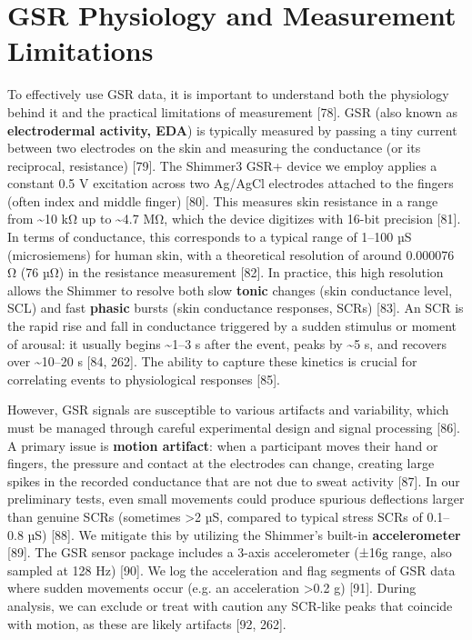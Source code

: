 \documentclass{article}
\begin{document}
    \section{GSR Physiology and Measurement Limitations}
    To effectively use GSR data, it is important to understand both the physiology behind it and the practical limitations of measurement [78]. GSR (also known as \textbf{electrodermal activity, EDA}) is typically measured by passing a tiny current between two electrodes on the skin and measuring the conductance (or its reciprocal, resistance) [79]. The Shimmer3 GSR+ device we employ applies a constant 0.5 V excitation across two Ag/AgCl electrodes attached to the fingers (often index and middle finger) [80]. This measures skin resistance in a range from \textasciitilde10 kΩ up to \textasciitilde4.7 MΩ, which the device digitizes with 16-bit precision [81]. In terms of conductance, this corresponds to a typical range of 1–100 µS (microsiemens) for human skin, with a theoretical resolution of around 0.000076 Ω (76 µΩ) in the resistance measurement [82]. In practice, this high resolution allows the Shimmer to resolve both slow \textbf{tonic} changes (skin conductance level, SCL) and fast \textbf{phasic} bursts (skin conductance responses, SCRs) [83]. An SCR is the rapid rise and fall in conductance triggered by a sudden stimulus or moment of arousal: it usually begins \textasciitilde1–3 s after the event, peaks by \textasciitilde5 s, and recovers over \textasciitilde10–20 s [84, 262]. The ability to capture these kinetics is crucial for correlating events to physiological responses [85].

    However, GSR signals are susceptible to various artifacts and variability, which must be managed through careful experimental design and signal processing [86]. A primary issue is \textbf{motion artifact}: when a participant moves their hand or fingers, the pressure and contact at the electrodes can change, creating large spikes in the recorded conductance that are not due to sweat activity [87]. In our preliminary tests, even small movements could produce spurious deflections larger than genuine SCRs (sometimes >2 µS, compared to typical stress SCRs of 0.1–0.8 µS) [88]. We mitigate this by utilizing the Shimmer’s built-in \textbf{accelerometer} [89]. The GSR sensor package includes a 3-axis accelerometer (±16g range, also sampled at 128 Hz) [90]. We log the acceleration and flag segments of GSR data where sudden movements occur (e.g. an acceleration >0.2 g) [91]. During analysis, we can exclude or treat with caution any SCR-like peaks that coincide with motion, as these are likely artifacts [92, 262].
\end{document}
